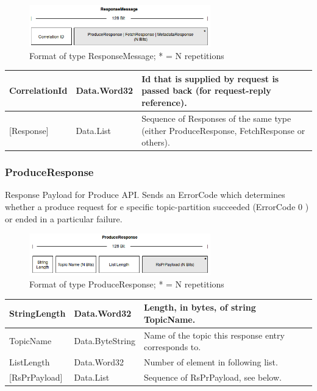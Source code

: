 \begin{figure}[H]
    \centering
    \includegraphics[width=0.7\textwidth]{images/impl-prot-types-responseMessage.png}
    \caption{Format of type ResponseMessage; * = N repetitions}
    \label{fig:impl-prot-types-responseMessage}
\end{figure}

\begin{table}[H]
\centering
\begin{tabular}{ l  l  p{10cm} }
\hline
CorrelationId  & Data.Word32 & Id that is supplied by request is passed back
(for request-reply reference).              \\ \hline
{[}Response{]} & Data.List   & Sequence of Responses of the same type (either
ProduceResponse, FetchResponse or others). \\ \hline
\end{tabular}
\end{table}


\subsubsection{ProduceResponse}
Response Payload for Produce API. Sends an ErrorCode which determines whether a
produce request for e specific topic-partition succeeded (ErrorCode 0 ) or ended
in a particular failure. 

\begin{figure}[H]
    \centering
    \includegraphics[width=0.7\textwidth]{images/impl-prot-types-produceResponse.png}
    \caption{Format of type ProduceResponse; * = N repetitions}
    \label{fig:impl-prot-types-produceResponse}
\end{figure}

\begin{table}[H]
\centering
\begin{tabular}{ l  l  p{10cm} }
\hline
StringLength      & Data.Word32     & Length, in bytes, of string TopicName. \\ \hline
TopicName         & Data.ByteString & Name of the topic this response entry corresponds to.\\ \hline
ListLength        & Data.Word32     & Number of element in following list.\\ \hline
{[}RsPrPayload{]} & Data.List       & Sequence of RsPrPayload, see below.
\\ \hline
\end{tabular}
\end{table}

